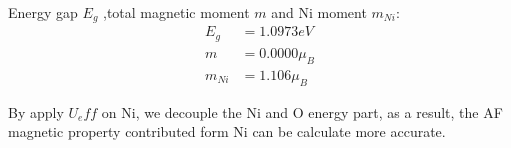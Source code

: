 \documentclass[notitlepage]{revtex4-1}
\begin{document}
\begin{CJK}{UTF8}{bsmi}
\begin{enumerate}
\begin{itemize}
\begin{enumerate}[label=(\arabic*)]
			Energy gap $E_g$ ,total magnetic moment $m$ and Ni moment $m_{Ni}$:
			\begin{align*}
			E_g &= 1.0973 eV \\ 
			m  &=  0.0000 \mu_{B}   \\
			m_{Ni} &= 1.106 \mu_{B}
			\end{align*}
			
			By apply $U_eff$ on Ni, we decouple the Ni and O energy part, as a result, the AF magnetic property contributed form Ni can be calculate more accurate. 
		\end{enumerate}
	\end{itemize}



\end{enumerate}


\end{CJK}



	
\end{document}
